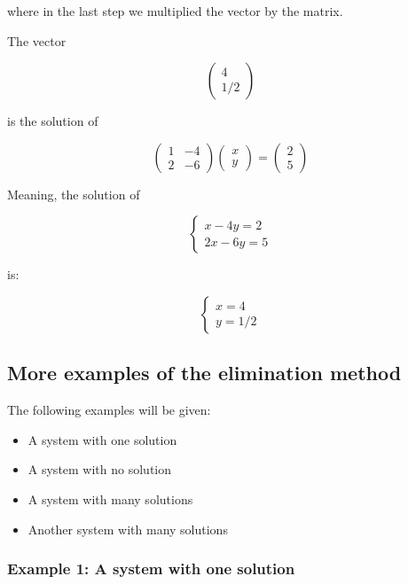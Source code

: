 \documentclass[
  letterpaper,
  DIV=11,
  numbers=noendperiod]{scrartcl}
\theoremstyle{definition}
\theoremstyle{remark}
\begin{document}
where in the last step we multiplied the vector by the matrix.

The vector

\[
\begin{pmatrix}4\\1/2\end{pmatrix}
\]

is the solution of

\[
\begin{pmatrix} 1 & -4\\ 2 & -6 \end{pmatrix}\begin{pmatrix}x\\y\end{pmatrix}= \begin{pmatrix}2\\5\end{pmatrix}
\]

Meaning, the solution of

\[
\begin{cases}x-4y =2\\2x-6y = 5\end{cases}
\]

is:

\[
\begin{cases}x =4\\y=1/2\end{cases}
\]

\subsection{More examples of the elimination
method}\label{more-examples-of-the-elimination-method}

The following examples will be given:

\begin{itemize}
\item
  A system with one solution
\item
  A system with no solution
\item
  A system with many solutions
\item
  Another system with many solutions
\end{itemize}

\subsubsection{Example 1: A system with one
solution}\label{example-1-a-system-with-one-solution}
\end{document}
